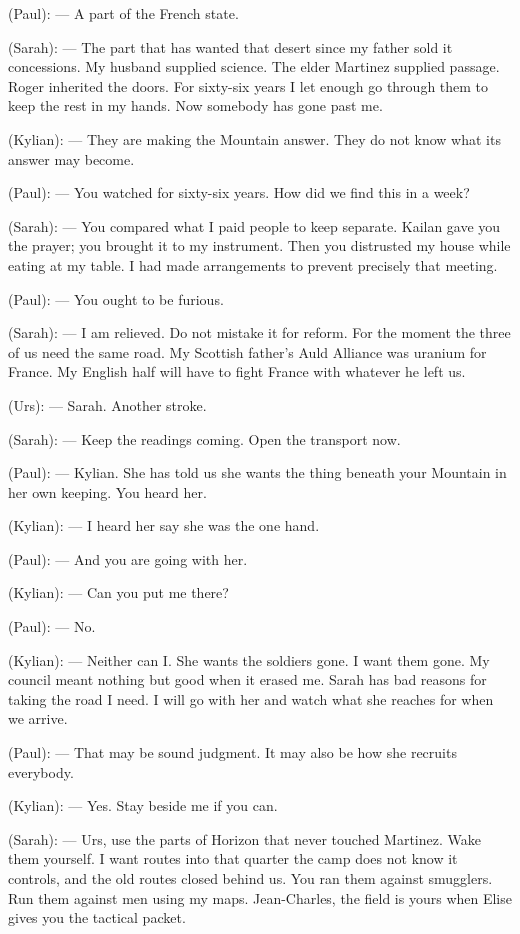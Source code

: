 \begin{room}
(Paul): --- A part of the French state.

(Sarah): --- The part that has wanted that desert since my father sold it concessions. My husband supplied science. The elder Martinez supplied passage. Roger inherited the doors. For sixty-six years I let enough go through them to keep the rest in my hands. Now somebody has gone past me.

(Kylian): --- They are making the Mountain answer. They do not know what its answer may become.

(Paul): --- You watched for sixty-six years. How did we find this in a week?

(Sarah): --- You compared what I paid people to keep separate. Kailan gave you the prayer; you brought it to my instrument. Then you distrusted my house while eating at my table. I had made arrangements to prevent precisely that meeting.

(Paul): --- You ought to be furious.

(Sarah): --- I am relieved. Do not mistake it for reform. For the moment the three of us need the same road. My Scottish father's Auld Alliance was uranium for France. My English half will have to fight France with whatever he left us.

(Urs): --- Sarah. Another stroke.

(Sarah): --- Keep the readings coming. Open the transport now.

\centerline{}

(Paul): --- Kylian. She has told us she wants the thing beneath your Mountain in her own keeping. You heard her.

(Kylian): --- I heard her say she was the one hand.

(Paul): --- And you are going with her.

(Kylian): --- Can you put me there?

(Paul): --- No.

(Kylian): --- Neither can I. She wants the soldiers gone. I want them gone. My council meant nothing but good when it erased me. Sarah has bad reasons for taking the road I need. I will go with her and watch what she reaches for when we arrive.

(Paul): --- That may be sound judgment. It may also be how she recruits everybody.

(Kylian): --- Yes. Stay beside me if you can.

(Sarah): --- Urs, use the parts of Horizon that never touched Martinez. Wake them yourself. I want routes into that quarter the camp does not know it controls, and the old routes closed behind us. You ran them against smugglers. Run them against men using my maps. Jean-Charles, the field is yours when Elise gives you the tactical packet.


\end{room}
